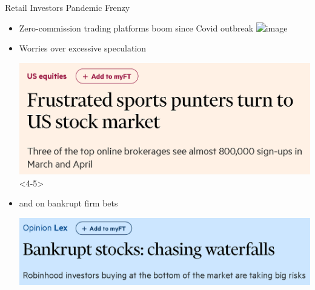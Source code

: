 \documentclass[10pt]{beamer}
\begin{document}
\begin{frame}{Retail Investors Pandemic Frenzy}

\begin{itemize}
\item Zero-commission trading platforms boom since Covid outbreak \pause
\includegraphics<2>[scale=0.2]{../../material/news_articles/cnbc_title.PNG} 
\pause
\vspace{7mm}
\item Worries over excessive speculation \pause \vspace{3mm}

\begin{center}

\includegraphics[scale=0.2]{../../material/news_articles/FT_robinhood_frustrated_gamblers_title.PNG}<4-5> \vspace{2mm}
\pause

\end{center}
\pause

\item and on bankrupt firm bets

\includegraphics[scale=0.3]{../../material/news_articles/FT_robinhood_bankrupt_stocks_title.PNG} 


\end{itemize}

\end{frame}
\end{document}
